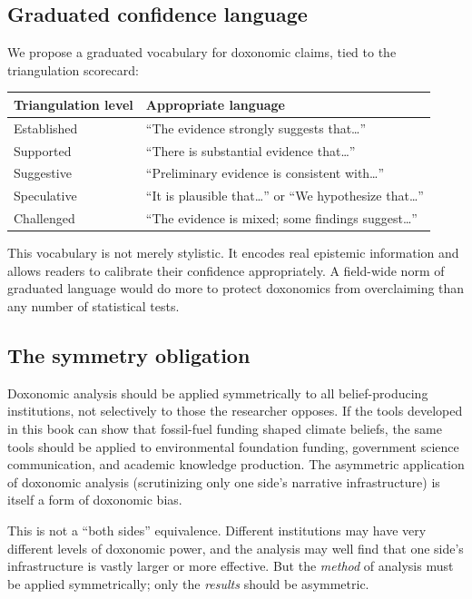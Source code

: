 \subsection{Graduated confidence language}

We propose a graduated vocabulary for doxonomic claims, tied to the triangulation scorecard:

\begin{center}
\begin{tabular}{ll}
\toprule
Triangulation level & Appropriate language \\
\midrule
Established & ``The evidence strongly suggests that\ldots'' \\
Supported & ``There is substantial evidence that\ldots'' \\
Suggestive & ``Preliminary evidence is consistent with\ldots'' \\
Speculative & ``It is plausible that\ldots'' or ``We hypothesize that\ldots'' \\
Challenged & ``The evidence is mixed; some findings suggest\ldots'' \\
\bottomrule
\end{tabular}
\end{center}

This vocabulary is not merely stylistic.
It encodes real epistemic information and allows readers to calibrate their confidence appropriately.
A field-wide norm of graduated language would do more to protect doxonomics from overclaiming than any number of statistical tests.

\subsection{The symmetry obligation}

\begin{principle}
\label{prin:symmetry}
Doxonomic analysis should be applied symmetrically to all belief-producing institutions, not selectively to those the researcher opposes.
If the tools developed in this book can show that fossil-fuel funding shaped climate beliefs, the same tools should be applied to environmental foundation funding, government science communication, and academic knowledge production.
The asymmetric application of doxonomic analysis (scrutinizing only one side's narrative infrastructure) is itself a form of doxonomic bias.
\end{principle}

This is not a ``both sides'' equivalence.
Different institutions may have very different levels of doxonomic power, and the analysis may well find that one side's infrastructure is vastly larger or more effective.
But the \emph{method} of analysis must be applied symmetrically; only the \emph{results} should be asymmetric.

